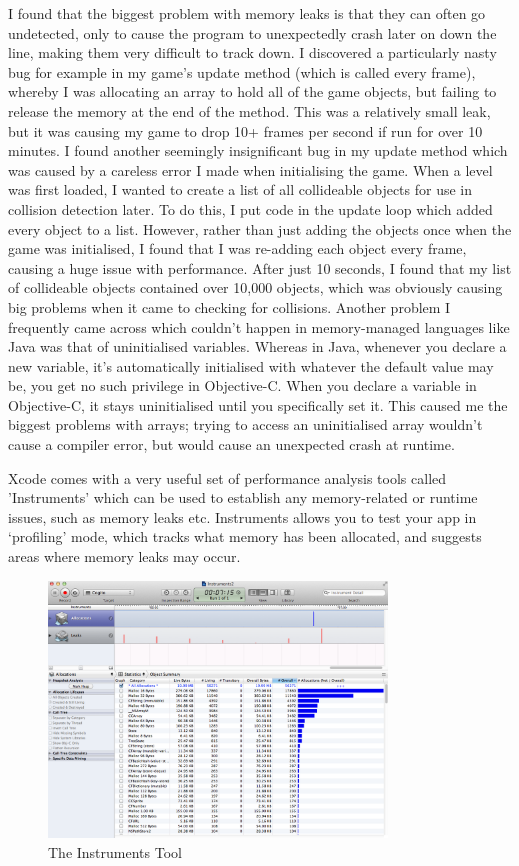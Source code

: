 \documentclass[a4paper,oneside]{report}
\begin{document}
I found that the biggest problem with memory leaks is that they can often go undetected, only to cause the program to unexpectedly crash later on down the line, making them very difficult to track down. I discovered a particularly nasty bug for example in my game's update method (which is called every frame), whereby I was allocating an array to hold all of the game objects, but failing to release the memory at the end of the method. This was a relatively small leak, but it was causing my game to drop 10+ frames per second if run for over 10 minutes. I found another seemingly insignificant bug in my update method which was caused by a careless error I made when initialising the game. When a level was first loaded, I wanted to create a list of all collideable objects for use in collision detection later. To do this, I put code in the update loop which added every object to a list. However, rather than just adding the objects once when the game was initialised, I found that I was re-adding each object every frame, causing a huge issue with performance. After just 10 seconds, I found that my list of collideable objects contained over 10,000 objects, which was obviously causing big problems when it came to checking for collisions. Another problem I frequently came across which couldn't happen in memory-managed languages like Java was that of uninitialised variables. Whereas in Java, whenever you declare a new variable, it's automatically initialised with whatever the default value may be, you get no such privilege in Objective-C. When you declare a variable in Objective-C, it stays uninitialised until you specifically set it. This caused me the biggest problems with arrays; trying to access an uninitialised array wouldn't cause a compiler error, but would cause an unexpected crash at runtime.

Xcode comes with a very useful set of performance analysis tools called 'Instruments' which can be used to establish any memory-related or runtime issues, such as memory leaks etc. Instruments allows you to test your app in `profiling' mode, which tracks what memory has been allocated, and suggests areas where memory leaks may occur.

\begin{figure}[h!]
  \centering
    \includegraphics[width=90mm]{sources/images/Instruments}
    \caption{The Instruments Tool}
    \label{fig:TextureAtlas}
\end{figure}
\end{document}

